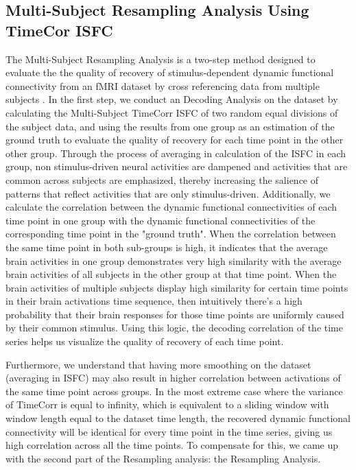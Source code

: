 \documentclass[11pt]{article}
\begin{document}
\subsection{Multi-Subject Resampling Analysis Using TimeCor ISFC}
The Multi-Subject Resampling Analysis is a two-step method designed to evaluate the the quality of recovery of stimulus-dependent dynamic functional connectivity from an fMRI dataset by cross referencing data from multiple subjects \citep{jeremy2017}. In the first step, we conduct an Decoding Analysis on the dataset by calculating the Multi-Subject TimeCorr ISFC of two random equal divisions of the subject data, and using the results from one group as an estimation of the ground truth to evaluate the quality of recovery for each time point in the other other group. Through the process of averaging in calculation of the ISFC in each group, non stimulus-driven neural activities are dampened and activities that are common across subjects are emphasized, thereby increasing the salience of patterns that reflect activities that are only stimulus-driven. Additionally, we calculate the correlation between the dynamic functional connectivities of each time point in one group with the dynamic functional connectivities of the corresponding time point in the "ground truth". When the correlation between the same time point in both sub-groups is high, it indicates that the average brain activities in one group demonstrates very high similarity with the average brain activities of all subjects in the other group at that time point. When the brain activities of multiple subjects display high similarity for certain time points in their brain activations time sequence, then intuitively there's a high probability that their brain responses for those time points are uniformly caused by their common stimulus. Using this logic, the decoding correlation of the time series helps us visualize the quality of recovery of each time point.

Furthermore, we understand that having more smoothing on the dataset (averaging in ISFC) may also result in higher correlation between activations of the same time point across groups. In the most extreme case where the variance of TimeCorr is equal to infinity, which is equivalent to a sliding window with window length equal to the dataset time length, the recovered dynamic functional connectivity will be identical for every time point in the time series, giving us high correlation across all the time points. To compensate for this, we came up with the second part of the Resampling analysis: the Resampling Analysis.
\end{document}
